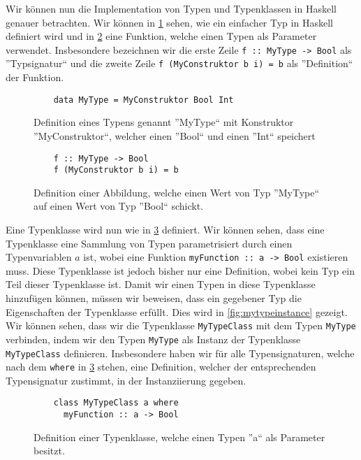 \documentclass{hhuarticle}
\theoremstyle{definition}
\theoremstyle{theorem}
\begin{document}
  Wir können nun die Implementation von Typen und Typenklassen in Haskell
  genauer betrachten. Wir können in \cref{fig:mytype} sehen, wie ein
  einfacher Typ in Haskell definiert wird und in \cref{fig:myfunction} eine
  Funktion, welche einen Typen als Parameter verwendet. Insbesondere
  bezeichnen wir die erste Zeile \verb|f :: MyType -> Bool| als ''Typsignatur``
  und die zweite Zeile \verb|f (MyConstruktor b i) = b| als ''Definition`` der Funktion.
  
  \begin{figure}[h]
    \begin{verbatim}
    data MyType = MyConstruktor Bool Int
    \end{verbatim}
    \caption{Definition eines Typens genannt ''MyType`` mit Konstruktor ''MyConstruktor``, welcher einen ''Bool`` und einen ''Int`` speichert \cite{constructorHaskellWiki}}%
    \label{fig:mytype}
  \end{figure}

  \begin{figure}[h]
    \begin{verbatim}
    f :: MyType -> Bool
    f (MyConstruktor b i) = b
    \end{verbatim}
    \caption{Definition einer Abbildung, welche einen Wert von Typ ''MyType`` auf einen Wert von Typ ''Bool`` schickt.}%
    \label{fig:myfunction}
  \end{figure}

  Eine Typenklasse wird nun wie in \cref{fig:mytypeclass} definiert. Wir
  können sehen, dass eine Typenklasse eine Sammlung von Typen
  parametrisiert durch einen Typenvariablen $a$ ist, wobei
  eine Funktion \verb|myFunction :: a -> Bool| existieren muss.
  Diese Typenklasse ist jedoch bisher nur eine Definition, wobei kein
  Typ ein Teil dieser Typenklasse ist. Damit wir einen Typen in diese
  Typenklasse hinzufügen können, müssen wir beweisen, dass ein gegebener
  Typ die Eigenschaften der Typenklasse erfüllt. Dies wird in \cref{fig:mytypeinstance}
  gezeigt. Wir können sehen, dass wir die Typenklasse \verb|MyTypeClass| mit dem Typen
  \verb|MyType| verbinden, indem wir den Typen \verb|MyType| als
  Instanz der Typenklasse \verb|MyTypeClass| definieren.
  Insbesondere haben wir für alle Typensignaturen, welche nach dem \verb|where|
  in \cref{fig:mytypeclass} stehen, eine Definition, welcher der
  entsprechenden Typensignatur zustimmt, in der Instanziierung gegeben.

  \begin{figure}[h]
    \begin{verbatim}
    class MyTypeClass a where
      myFunction :: a -> Bool
    \end{verbatim}
    \caption{Definition einer Typenklasse, welche einen Typen ''a`` als Parameter besitzt.}%
    \label{fig:mytypeclass}
  \end{figure}
\end{document}
